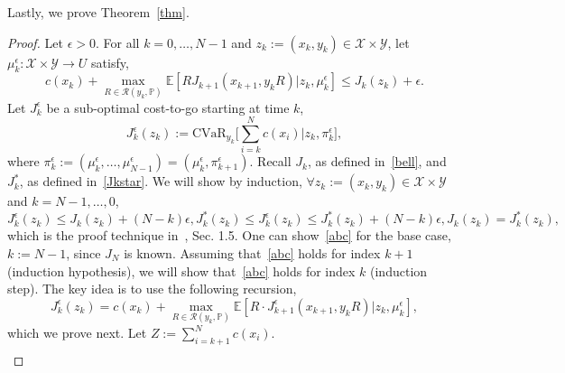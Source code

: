 \documentclass[letterpaper, 10 pt, conference]{ieeeconf}  %
\begin{document}
Lastly, we prove Theorem~\ref{thm}.\\
\begin{proof}
Let $\epsilon > 0$. For all $k = 0, \dots, N-1$ and $z_k := (x_k, y_k) \in \mathcal{X} \times \mathcal{Y}$, let $\mu_k^\epsilon : \mathcal{X} \times \mathcal{Y} \to U$ satisfy,
%
\begin{equation} 
c(x_k) + {\underset{R \in \mathcal{R}(y_k, \mathbb{P})}\max} \mathbb{E}[ RJ_{k+1}(x_{k+1}, y_k R) | z_k, \mu_k^\epsilon] \leq J_k(z_k) + \epsilon.
\label{first}\end{equation} 
%
Let $J_k^\epsilon$ be a sub-optimal cost-to-go starting at time $k$,
%
\begin{equation} 
J_k^\epsilon(z_k) := \text{CVaR}_{y_k}\big[\textstyle \sum_{i=k}^N c(x_i) \big| z_k, \pi_k^\epsilon \big],
\label{Jkeps}\end{equation}
%
where $\pi_k^\epsilon := (\mu_k^\epsilon,\dots,\mu_{N-1}^\epsilon) = (\mu_k^\epsilon, \pi_{k+1}^\epsilon)$. Recall $J_k$, as defined in~\eqref{bell}, and $J_k^*$, as defined in~\eqref{Jkstar}.
We will show by induction, $\forall z_k := (x_k, y_k) \in \mathcal{X} \times \mathcal{Y}$ and $k = N-1, \dots, 0$,
%
\begin{subequations}\label{abc}
\begin{equation}
J_k^\epsilon(z_k) \leq J_k(z_k) + (N-k)\epsilon, 
\label{a}\end{equation}
%
\begin{equation}
J_k^*(z_k) \leq J_k^\epsilon(z_k) \leq J_k^*(z_k) + (N-k)\epsilon, 
\label{b}\end{equation}
%
\begin{equation}
J_k(z_k) = J_k^*(z_k), 
\label{c}\end{equation}
\end{subequations}
%
which is the proof technique in~\cite{bertsekas2005dynamic}, Sec. 1.5. 
One can show~\eqref{abc} for the base case, $k := N-1$, since $J_N$ is known.
Assuming that~\eqref{abc} holds for index $k+1$ (induction hypothesis), we will show that~\eqref{abc} holds for index $k$ (induction step). The key 
idea is to use the following recursion,
%
\begin{equation}
J_k^\epsilon(z_k) = c(x_k) + {\underset{R \in \mathcal{R}(y_k, \mathbb{P})}\max} \mathbb{E}[ R\cdot J^\epsilon_{k+1}(x_{k+1}, y_k R) | z_k, \mu_k^\epsilon],
\label{Jkepsrec}\end{equation}
%
which we prove next. Let $Z := \sum_{i=k+1}^N c(x_i)$. 
%
\begin{equation*}\begin{aligned}

\end{aligned}
\end{equation*}
\end{proof}
\end{document}
